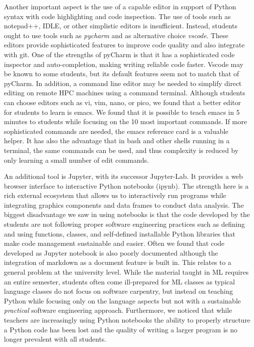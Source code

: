 \documentclass[utf8]{FrontiersinVancouver} %
\begin{document}
Another important aspect is the use of a capable editor in support of
Python syntax with code highlighting and code inspection. The use of
tools such as notepad++, IDLE, or other simplistic editors is
insufficient. Instead, students ought to use tools such as {\em
  pycharm} and as alternative choice {\em vscode}. These editors
provide sophisticated features to improve code quality and also
integrate with git. One of the strengths of pyCharm is that it has a
sophisticated code inspector and auto-completion, making writing
reliable code faster. Vscode may be known to some students, but its
default features seem not to match that of pyCharm. In addition, a
command line editor may be needed to simplify direct editing on remote
HPC machines using a command terminal. Although students can choose
editors such as vi, vim, nano, or pico, we found that a better editor
for students to learn is emacs. We found that it is possible to teach
emacs in 5 minutes to students while focusing on the 10 most important
commands. If more sophisticated commands are needed, the emacs
reference card is a valuable helper. It has also the advantage that in
bash and other shells running in a terminal, the same commands can be
used, and thus complexity is reduced by only learning a small number
of edit commands.

An additional tool is Jupyter, with its successor Jupyter-Lab. It
provides a web browser interface to interactive Python notebooks
(ipynb). The strength here is a rich external ecosystem that allows us
to interactively run programs while integrating graphics components
and data frames to conduct data analysis.  The biggest disadvantage we
saw in using notebooks is that the code developed by the students are
not following proper software engineering practices such as defining
and using functions, classes, and self-defined installable Python
libraries that make code management sustainable and easier. Often we
found that code developed as Jupyter notebook is also poorly
documented although the integration of markdown as a document feature
is built in. This relates to a general problem at the university
level. While the material taught in ML requires an entire semester,
students often come ill-prepared for ML classes as typical language
classes do not focus on software carpentry, but instead on teaching
Python while focusing only on the language aspects but not with a
sustainable {\em practical} software engineering
approach. Furthermore, we noticed that while teachers are increasingly
using Python notebooks the ability to properly structure a Python code
has been lost and the quality of writing a larger program is no longer
prevalent with all students.
\end{document}
